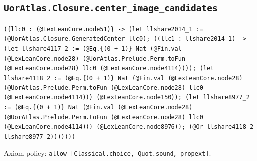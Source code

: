 \documentclass[11pt]{article}
\begin{document}
\subsection*{\texttt{UorAtlas.Closure.center\_image\_candidates}}
\noindent\texttt{(\{llc0 : (@LexLeanCore.node51)\} -> (let llshare2014\_1 := (@UorAtlas.Closure.GeneratedCenter llc0); ((llc1 : llshare2014\_1) -> (let llshare4117\_2 := (@Eq.\{(0 + 1)\} Nat (@Fin.val (@LexLeanCore.node28) (@UorAtlas.Prelude.Perm.toFun (@LexLeanCore.node28) llc0 (@LexLeanCore.node4114)))); (let llshare4118\_2 := (@Eq.\{(0 + 1)\} Nat (@Fin.val (@LexLeanCore.node28) (@UorAtlas.Prelude.Perm.toFun (@LexLeanCore.node28) llc0 (@LexLeanCore.node4114))) (@LexLeanCore.node150)); (let llshare8977\_2 := (@Eq.\{(0 + 1)\} Nat (@Fin.val (@LexLeanCore.node28) (@UorAtlas.Prelude.Perm.toFun (@LexLeanCore.node28) llc0 (@LexLeanCore.node4114))) (@LexLeanCore.node8976)); (@Or llshare4118\_2 llshare8977\_2)))))))}\par
\noindent Axiom policy: \texttt{allow [Classical.choice, Quot.sound, propext]}.\par
\end{document}
